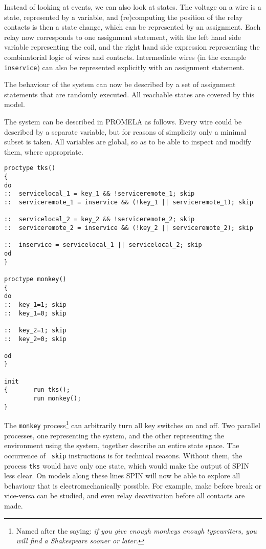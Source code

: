 Instead of looking at events, we can also look at states.
The voltage on a wire is a state, represented by a variable,
and (re)computing the position of the relay contacts is
then a state change, which can be
represented by an assignment.
Each relay now corresponds to one assignment statement, with the left hand
side variable representing the coil, and the right hand side expression
representing the combinatorial logic of wires and contacts.
Intermediate wires (in the example {\tt inservice}) can also be represented
explicitly with an assignment statement.

The behaviour of the system can now be described by a set of assignment statements that are
randomly executed.
All reachable states are covered by this model.

The system can be described in PROMELA as follows. Every wire could be described by a separate
variable, but for reasons of simplicity only a minimal subset is taken. All variables are
global, so as to be able to inspect and modify them, where appropriate.

\begin{verbatim}
proctype tks()
{
do
::	servicelocal_1 = key_1 && !serviceremote_1; skip
::	serviceremote_1 = inservice && (!key_1 || serviceremote_1); skip

::	servicelocal_2 = key_2 && !serviceremote_2; skip
::	serviceremote_2 = inservice && (!key_2 || serviceremote_2); skip

::	inservice = servicelocal_1 || servicelocal_2; skip
od
}

proctype monkey()
{
do
::	key_1=1; skip
::	key_1=0; skip

::	key_2=1; skip
::	key_2=0; skip

od
}

init
{       run tks();
        run monkey();
}
\end{verbatim}

The {\tt monkey} process\footnote{Named after the saying: {\em if you give enough monkeys
enough typewriters, you will find a Shakespeare sooner or later.}}
can arbitrarily turn all key switches on and off.
Two parallel processes, one representing the system, and the other representing the
environment using the system, together describe an entire state space. The occurrence of {\tt
skip} instructions is for technical reasons.
Without them, the process {\tt tks} would have only one state, which would make the output of
SPIN less clear.
On models along these lines SPIN will now be able to explore all behaviour
that is electromechanically possible.
For example, make before break or vice-versa can be studied, and even relay deavtivation before all contacts are made.

